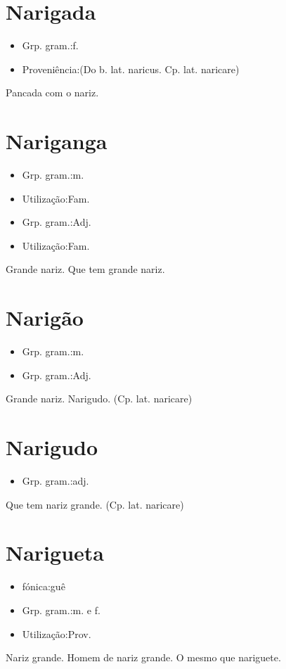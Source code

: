 \section{Narigada}
\begin{itemize}
\item {Grp. gram.:f.}
\end{itemize}
\begin{itemize}
\item {Proveniência:(Do b. lat. \textunderscore naricus\textunderscore . Cp. lat. \textunderscore naricare\textunderscore )}
\end{itemize}
Pancada com o nariz.
\section{Nariganga}
\begin{itemize}
\item {Grp. gram.:m.}
\end{itemize}
\begin{itemize}
\item {Utilização:Fam.}
\end{itemize}
\begin{itemize}
\item {Grp. gram.:Adj.}
\end{itemize}
\begin{itemize}
\item {Utilização:Fam.}
\end{itemize}
Grande nariz.
Que tem grande nariz.
\section{Narigão}
\begin{itemize}
\item {Grp. gram.:m.}
\end{itemize}
\begin{itemize}
\item {Grp. gram.:Adj.}
\end{itemize}
Grande nariz.
Narigudo.
(Cp. lat. \textunderscore naricare\textunderscore )
\section{Narigudo}
\begin{itemize}
\item {Grp. gram.:adj.}
\end{itemize}
Que tem nariz grande.
(Cp. lat. \textunderscore naricare\textunderscore )
\section{Narigueta}
\begin{itemize}
\item {fónica:guê}
\end{itemize}
\begin{itemize}
\item {Grp. gram.:m.  e  f.}
\end{itemize}
\begin{itemize}
\item {Utilização:Prov.}
\end{itemize}
Nariz grande.
Homem de nariz grande.
O mesmo que \textunderscore nariguete\textunderscore .
